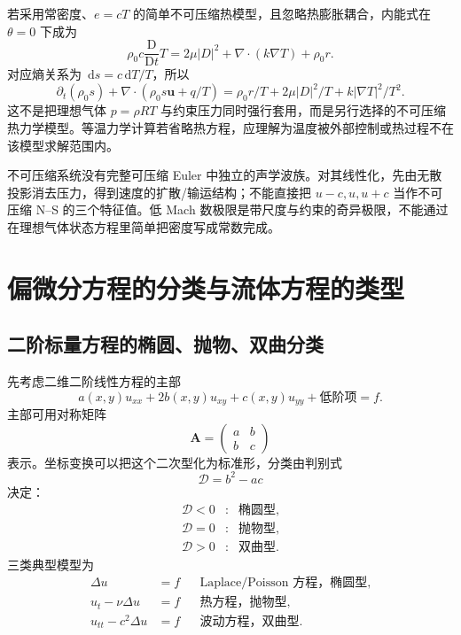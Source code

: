 \documentclass[cn,hazy,blue,11pt,normal]{elegantnote}
\numberwithin{equation}{section}
\newcommand{\dd}{\,\mathrm d}
\newcommand{\Dt}{\frac{\mathrm D}{\mathrm Dt}}
\newcommand{\vct}[1]{\bm{#1}}
\newcommand{\ten}[1]{\bm{#1}}
\begin{document}
若采用常密度、$e=cT$ 的简单不可压缩热模型，且忽略热膨胀耦合，内能式在 $\theta=0$ 下成为
\begin{equation}
 \rho_0c\Dt T=2\mu|D|^2+\nabla\cdot(k\nabla T)+\rho_0r.
\end{equation}
对应熵关系为 $\dd s=c\dd T/T$，所以
\begin{equation}
 \partial_t(\rho_0s)+\nabla\cdot(\rho_0s\vct u+q/T)
 =\rho_0r/T+2\mu|D|^2/T+k|\nabla T|^2/T^2.
\end{equation}
这不是把理想气体 $p=\rho RT$ 与约束压力同时强行套用，而是另行选择的不可压缩热力学模型。等温力学计算若省略热方程，应理解为温度被外部控制或热过程不在该模型求解范围内。

不可压缩系统没有完整可压缩 Euler 中独立的声学波族。对其线性化，先由无散投影消去压力，得到速度的扩散/输运结构；不能直接把 $u-c,u,u+c$ 当作不可压缩 N--S 的三个特征值。低 Mach 数极限是带尺度与约束的奇异极限，不能通过在理想气体状态方程里简单把密度写成常数完成。



\section{偏微分方程的分类与流体方程的类型}

\subsection{二阶标量方程的椭圆、抛物、双曲分类}

先考虑二维二阶线性方程的主部
\begin{equation}
 a(x,y)u_{xx}+2b(x,y)u_{xy}+c(x,y)u_{yy}
 +\text{低阶项}=f.
\end{equation}
主部可用对称矩阵
\begin{equation}
 \ten A=
 \begin{pmatrix}a&b\\b&c\end{pmatrix}
\end{equation}
表示。坐标变换可以把这个二次型化为标准形，分类由判别式
\begin{equation}
 \mathcal D=b^2-ac
\end{equation}
决定：
\begin{equation}
 \boxed{
 \begin{array}{ccl}
 \mathcal D<0&:&\text{椭圆型},\\
 \mathcal D=0&:&\text{抛物型},\\
 \mathcal D>0&:&\text{双曲型}.
 \end{array}}
\end{equation}
三类典型模型为
\begin{align}
 \Delta u&=f &&\text{Laplace/Poisson 方程，椭圆型},\\
 u_t-\nu\Delta u&=f &&\text{热方程，抛物型},\\
 u_{tt}-c^2\Delta u&=f &&\text{波动方程，双曲型}.
\end{align}
\end{document}
